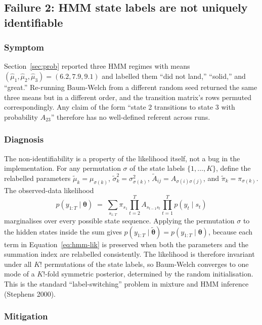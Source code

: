 \documentclass{article}
\begin{document}
\subsection{Failure 2: HMM state labels are not uniquely identifiable}

\subsubsection*{Symptom}

Section~\ref{sec:prob} reported three HMM regimes with means $(\hat{\mu}_1, \hat{\mu}_2, \hat{\mu}_3) = (6.2, 7.9, 9.1)$ and labelled them ``did not land,'' ``solid,'' and ``great.'' Re-running Baum-Welch from a different random seed returned the same three means but in a different order, and the transition matrix's rows permuted correspondingly. Any claim of the form ``state 2 transitions to state 3 with probability $A_{23}$'' therefore has no well-defined referent across runs.

\subsubsection*{Diagnosis}

The non-identifiability is a property of the likelihood itself, not a bug in the implementation. For any permutation $\sigma$ of the state labels $\{1, \ldots, K\}$, define the relabelled parameters $\tilde{\mu}_k = \mu_{\sigma(k)}$, $\tilde{\sigma}_k^2 = \sigma_{\sigma(k)}^2$, $\tilde{A}_{ij} = A_{\sigma(i)\sigma(j)}$, and $\tilde{\pi}_k = \pi_{\sigma(k)}$. The observed-data likelihood
\begin{equation}
p(y_{1:T} \mid \boldsymbol{\theta}) \;=\; \sum_{s_{1:T}} \pi_{s_1} \prod_{t=2}^{T} A_{s_{t-1} s_t} \prod_{t=1}^{T} p(y_t \mid s_t)
\label{eq:hmm-lik}
\end{equation}
marginalises over every possible state sequence. Applying the permutation $\sigma$ to the hidden states inside the sum gives $p(y_{1:T} \mid \tilde{\boldsymbol{\theta}}) = p(y_{1:T} \mid \boldsymbol{\theta})$, because each term in Equation~\ref{eq:hmm-lik} is preserved when both the parameters and the summation index are relabelled consistently. The likelihood is therefore invariant under all $K!$ permutations of the state labels, so Baum-Welch converges to one mode of a $K!$-fold symmetric posterior, determined by the random initialisation. This is the standard ``label-switching'' problem in mixture and HMM inference (Stephens 2000).

\subsubsection*{Mitigation}
\end{document}
